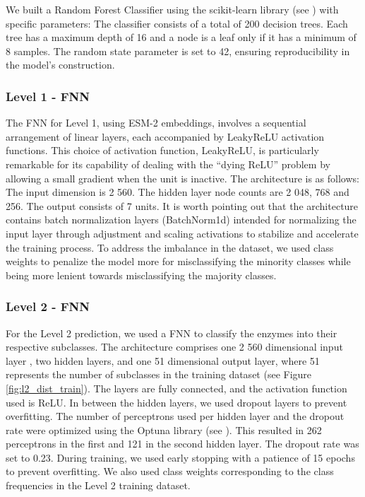 \documentclass{bioinfo}
\begin{document}
\begin{methods}
We built a Random Forest Classifier using the scikit-learn library (see \cite{scikit-learn}) with specific parameters: 
The classifier consists of a total of 200 decision trees. Each tree has a
maximum depth of 16 and a node is a leaf only if it has a
minimum of 8 samples. The random state parameter is set to 42, ensuring
reproducibility in the model's construction.

\subsubsection{Level 1 - FNN}\label{sec:level1_methods}
The FNN for Level 1, using ESM-2 embeddings, involves a sequential arrangement of linear layers, each accompanied by LeakyReLU activation functions.
This choice of activation function, LeakyReLU, is particularly remarkable for its capability of dealing with the ``dying ReLU'' problem by 
allowing a small gradient when the unit is inactive. 
The architecture is as follows: The input dimension is 2 560.
The hidden layer node counts are 2 048,
768 and 256. The output consists of 7 units.
It is worth pointing out that the architecture contains batch normalization layers (BatchNorm1d) intended for 
normalizing the input layer through adjustment and scaling activations to stabilize and accelerate the training process.
To address the imbalance in the dataset, we used class weights to penalize the model more for misclassifying the minority classes
while being more lenient towards misclassifying the majority classes.

\subsubsection{Level 2 - FNN}\label{sec:level2_methods}
For the Level 2 prediction, we used a FNN to classify the enzymes into their respective subclasses.
The architecture comprises one 2 560 dimensional input layer , two hidden layers, and one 51 dimensional output layer,
where 51 represents the number of subclasses in the training dataset (see Figure \ref{fig:l2_dist_train}).
The layers are fully connected, and the activation function used is ReLU.
In between the hidden layers, we used dropout layers to prevent overfitting.
The number of perceptrons used per hidden layer and the dropout rate were optimized using the Optuna library (see \cite{optuna_2019}).
This resulted in 262 perceptrons in the first and 121 in the second hidden layer.
The dropout rate was set to 0.23.
During training, we used early stopping with a patience of 15 epochs to prevent overfitting.
We also used class weights corresponding to the class frequencies in the Level 2 training dataset.




\end{methods}
\end{document}
